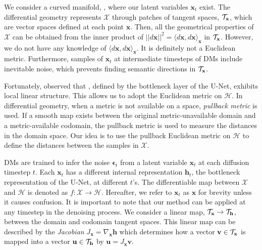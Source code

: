 We consider a curved manifold, \exspace{}, where our latent variables $\mathbf{x}_t$ exist. 
The differential geometry represents $\mathcal{X}$ through patches of tangent spaces, $\mathcal{T}_\mathbf{x}{}$, which are vector spaces defined at each point $\mathbf{x}$. 
Then, all the geometrical properties of $\mathcal{X}$ can be obtained from the inner product of $||d\mathbf{x}||^2 = \langle d{\mathbf{x}},d{\mathbf{x}} \rangle_\mathbf{x}$ in $\mathcal{T}_\mathbf{x}{}$.
However, we do not have any knowledge of $\langle d{\mathbf{x}},d{\mathbf{x}} \rangle_\mathbf{x}$.
It is definitely not a Euclidean metric. Furthermore, samples of $\mathbf{x}_t$ at intermediate timesteps of DMs include inevitable noise, which prevents finding semantic directions in $\mathcal{T}_\mathbf{x}{}$.

Fortunately, \citet{kwon2022diffusion} observed that \ehspace{}, defined by the bottleneck layer of the U-Net, exhibits local linear structure.
This allows us to adopt the Euclidean metric on $\mathcal{H}$.
In differential geometry, when a metric is not available on a space, {\it pullback metric} is used.
If a smooth map exists between the original metric-unavailable domain and a metric-available codomain, the pullback metric is used to measure the distances in the domain space.
Our idea is to use the pullback Euclidean metric on $\mathcal{H}$ to define the distances between the samples in $\mathcal{X}$.

DMs are trained to infer the noise $\mathbf{\epsilon}_t$ from a latent variable $\mathbf{x}_t$ at each diffusion timestep $t$. 
Each $\mathbf{x}_t$ has a different internal representation $\mathbf{h}_t$, the bottleneck representation of the U-Net, at different $t$'s.
The differentiable map between $\mathcal{X}$ and $\mathcal{H}$ is denoted as $f : \mathcal{X} \rightarrow \mathcal{H}$.
Hereafter, we refer to $\mathbf{x}_t$ as $\mathbf{x}$ for brevity unless it causes confusion. It is important to note that our method can be applied at any timestep in the denoising process.
{We consider a linear map, $\mathcal{T}_\mathbf{x}{} \rightarrow \mathcal{T}_\mathbf{h}{}$, between the domain and codomain tangent spaces.}
This linear map can be described by the {\it Jacobian} $J_{\mathbf{x}} = \nabla_{\mathbf{x}} \mathbf{h}$
which determines how a vector $\mathbf{v} \in \mathcal{T}_\mathbf{x}{}$ is mapped into a vector $\mathbf{u} \in \mathcal{T}_\mathbf{h}{}$ by
$\mathbf{u} = J_{\mathbf{x}} \mathbf{v}$. 

